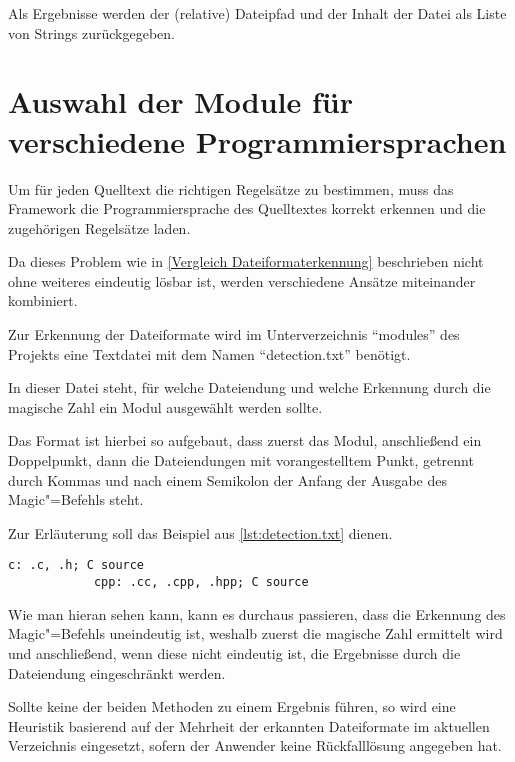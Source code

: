         Als Ergebnisse werden der
        (relative) Dateipfad und
        der Inhalt der Datei als Liste von Strings zurückgegeben.

    \section{Auswahl der Module für verschiedene Programmiersprachen}\label{Auswahl der Module für verschiedene Programmiersprachen}
        Um für jeden Quelltext die richtigen Regelsätze zu bestimmen,
        muss das Framework die Programmiersprache des Quelltextes korrekt erkennen und
        die zugehörigen Regelsätze laden.

        Da dieses Problem wie in
        \vref{Vergleich Dateiformaterkennung} beschrieben nicht ohne weiteres eindeutig lösbar ist,
        werden verschiedene Ansätze miteinander kombiniert.

        Zur Erkennung der Dateiformate wird im Unterverzeichnis
        \foreignquote{english}{modules} des Projekts eine Textdatei mit dem Namen
        \foreignquote{english}{detection.txt} benötigt.

        In dieser Datei steht,
        für welche Dateiendung und
        welche Erkennung durch die magische Zahl ein Modul ausgewählt werden sollte.

        Das Format ist hierbei so aufgebaut,
        dass zuerst das Modul,
        anschließend ein Doppelpunkt,
        dann die Dateiendungen mit vorangestelltem Punkt,
        getrennt durch Kommas und
        nach einem Semikolon der Anfang der Ausgabe des Magic"=Befehls steht.

        Zur Erläuterung soll das Beispiel aus
        \vref{lst:detection.txt} dienen.

        \begin{lstlisting}[caption={Beispieleinträge in der detection.txt}, label={lst:detection.txt}, gobble=12]
            c: .c, .h; C source
            cpp: .cc, .cpp, .hpp; C source
        \end{lstlisting}

        Wie man hieran sehen kann,
        kann es durchaus passieren,
        dass die Erkennung des Magic"=Befehls uneindeutig ist,
        weshalb zuerst die magische Zahl ermittelt wird und
        anschließend,
        wenn diese nicht eindeutig ist,
        die Ergebnisse durch die Dateiendung eingeschränkt werden.

        Sollte keine der beiden Methoden zu einem Ergebnis führen,
        so wird eine Heuristik basierend auf der Mehrheit der erkannten Dateiformate im aktuellen Verzeichnis eingesetzt,
        sofern der Anwender keine Rückfalllösung angegeben hat.

